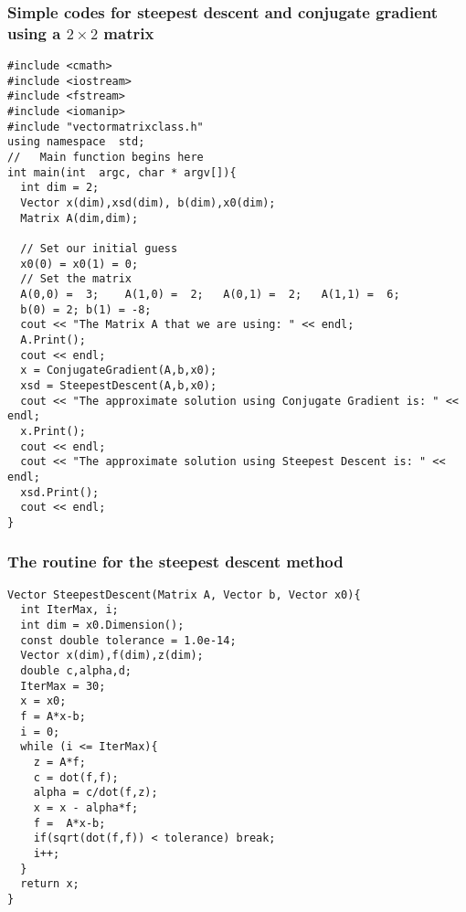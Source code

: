 \documentclass{beamer}
\begin{document}
\begin{frame}
\frametitle{Simple codes for  steepest descent and conjugate gradient using a $2\times 2$ matrix}

\begin{block}{}
\begin{verbatim}
#include <cmath>
#include <iostream>
#include <fstream>
#include <iomanip>
#include "vectormatrixclass.h"
using namespace  std;
//   Main function begins here
int main(int  argc, char * argv[]){
  int dim = 2;
  Vector x(dim),xsd(dim), b(dim),x0(dim);
  Matrix A(dim,dim);
  
  // Set our initial guess
  x0(0) = x0(1) = 0;
  // Set the matrix  
  A(0,0) =  3;    A(1,0) =  2;   A(0,1) =  2;   A(1,1) =  6; 
  b(0) = 2; b(1) = -8;
  cout << "The Matrix A that we are using: " << endl;
  A.Print();
  cout << endl;
  x = ConjugateGradient(A,b,x0);
  xsd = SteepestDescent(A,b,x0);
  cout << "The approximate solution using Conjugate Gradient is: " << endl;
  x.Print();
  cout << endl;
  cout << "The approximate solution using Steepest Descent is: " << endl;
  xsd.Print();
  cout << endl;
}
\end{verbatim}
\end{block}
\end{frame}

\begin{frame}
\frametitle{The routine for the steepest descent method}

\begin{block}{}
\begin{verbatim}
Vector SteepestDescent(Matrix A, Vector b, Vector x0){
  int IterMax, i;
  int dim = x0.Dimension();
  const double tolerance = 1.0e-14;
  Vector x(dim),f(dim),z(dim);
  double c,alpha,d;
  IterMax = 30;
  x = x0;
  f = A*x-b;
  i = 0;
  while (i <= IterMax){
    z = A*f;
    c = dot(f,f);
    alpha = c/dot(f,z);
    x = x - alpha*f;
    f =  A*x-b;
    if(sqrt(dot(f,f)) < tolerance) break;
    i++;
  }
  return x;
} 
\end{verbatim}
\end{block}
\end{frame}
\end{document}
